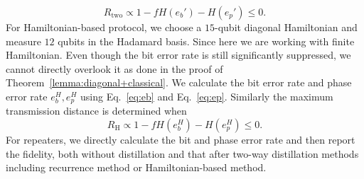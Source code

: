 \documentclass[onecolumn,prx,longbibliography,nofootinbib, superscriptaddress]{revtex4-2}
\theoremstyle{recap}
\begin{document}
\begin{equation}
    R_{\mathrm{two}}\propto 1-fH(e_b')-H(e_p')\leq 0.
\end{equation}
For Hamiltonian-based protocol, we choose a $15$-qubit diagonal Hamiltonian and measure $12$ qubits in the Hadamard basis. Since here we are working with finite Hamiltonian. Even though the bit error rate is still significantly suppressed, we cannot directly overlook it as done in the proof of Theorem~\ref{lemma:diagonal+classical}. We calculate the bit error rate and phase error rate $e_b^{H},e_p^{H}$ using Eq.~\eqref{eq:eb} and Eq.~\eqref{eq:ep}. Similarly the maximum transmission distance is determined when
\begin{equation}
    R_{\mathrm{H}}\propto 1-fH(e_b^{H})-H(e_p^{H})\leq 0.
\end{equation}
For repeaters, we directly calculate the bit and phase error rate and then report the fidelity, both without distillation and that after two-way distillation methods including recurrence method or Hamiltonian-based method.
\end{document}
